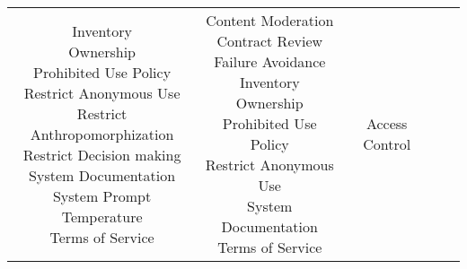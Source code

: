 \documentclass[fleqn]{article}
\begin{document}
\begin{landscape}
\begin{table}[H]
\begin{tabular}{|c|c|c|c|c|}
{			\textbullet\hspace{3pt} Inventory \\
			\textbullet\hspace{3pt} Ownership \\		 		
			\textbullet\hspace{3pt} Prohibited Use Policy\\
			\textbullet\hspace{3pt} Restrict Anonymous Use\\ 
			\textbullet\hspace{3pt} Restrict Anthropomorphization \\
			\textbullet\hspace{3pt} Restrict Decision making \\
			\textbullet\hspace{3pt} System Documentation \\
			\textbullet\hspace{3pt} System Prompt \\
			\textbullet\hspace{3pt} Temperature	\\
			\textbullet\hspace{3pt} Terms of Service\\ 		
		} & 
		\makecell[l]{ 	
			\textbullet\hspace{3pt} Content Moderation\\ 	
			\textbullet\hspace{3pt} Contract Review\\ 	
			\textbullet\hspace{3pt} Failure Avoidance\\ 	
			\textbullet\hspace{3pt} Inventory\\ 	
			\textbullet\hspace{3pt} Ownership\\ 	
			\textbullet\hspace{3pt} Prohibited Use Policy\\ 	
			\textbullet\hspace{3pt} Restrict Anonymous Use\\ 				
			\textbullet\hspace{3pt} System Documentation\\ 	
			\textbullet\hspace{3pt} Terms of Service\\ 	
		} & 
		\makecell[l]{ 	
			\textbullet\hspace{3pt} Access Control\\ 	
}
\end{tabular}
\end{table}
\end{landscape}
\end{document}
